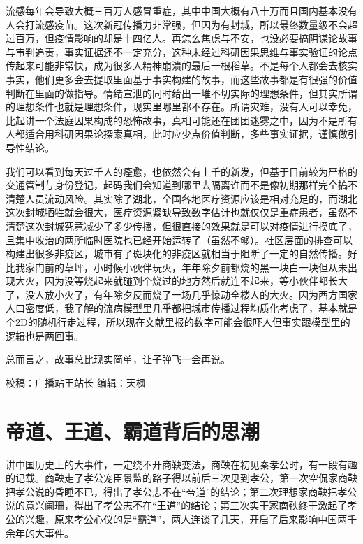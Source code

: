 \documentclass[
]{book}
\begin{document}
流感每年会导致大概三百万人感冒重症，其中中国大概有八十万而且国内基本没有人会打流感疫苗。这次新冠传播力非常强，但因为有封城，所以最终数量级不会超过百万，但疫情影响的却是十四亿人。再怎么焦虑与不安，也没必要搞阴谋论故事与审判追责，事实证据还不一定充分，这种未经过科研因果思维与事实验证的论点传起来可能非常快，成为很多人精神崩溃的最后一根稻草。不是每个人都会去核实事实，他们更多会去提取里面基于事实构建的故事，而这些故事都是有很强的价值判断在里面的做指导。情绪宣泄的同时给出一堆不切实际的理想条件，但其实所谓的理想条件也就是理想条件，现实里哪里都不存在。所谓灾难，没有人可以幸免，比起讲一个法庭因果构成的恐怖故事，真相可能还在团团迷雾之中，因为不是所有人都适合用科研因果论探索真相，此时应少点价值判断，多些事实证据，谨慎做引导性结论。

我们可以看到每天过千人的痊愈，也依然会有上千的新发，但基于目前较为严格的交通管制与身份登记，起码我们会知道到哪里去隔离谁而不是像初期那样完全搞不清楚人员流动风险。其实除了湖北，全国各地医疗资源应该是相对充足的，而湖北这次封城牺牲就会很大，医疗资源紧缺导致数字估计也就仅仅是重症患者，虽然不清楚这次封城究竟减少了多少传播，但很直接的效果就是可以对疫情进行摸底了，且集中收治的两所临时医院也已经开始运转了（虽然不够）。社区层面的排查可以构建出很多非疫区，城市有了斑块化的非疫区就相当于阻断了一定的自然传播。好比我家门前的草坪，小时候小伙伴玩火，年年除夕前都烧的黑一块白一块但从未出现大火，因为没等烧起来就碰到个烧过的地方然后就连不起来，等小伙伴都长大了，没人放小火了，有年除夕反而烧了一场几乎惊动全楼人的大火。因为西方国家人口密度低，我了解的流病模型里几乎都把城市传播过程均质化考虑了，基本就是个2D的随机行走过程，所以现在文献里报的数字可能会很吓人但事实跟模型里的逻辑也是两回事。

总而言之，故事总比现实简单，让子弹飞一会再说。

校稿：广播站王站长
编辑：天枫

\hypertarget{ux5e1dux9053ux738bux9053ux9738ux9053ux80ccux540eux7684ux601dux6f6e}{%
\section{帝道、王道、霸道背后的思潮}\label{ux5e1dux9053ux738bux9053ux9738ux9053ux80ccux540eux7684ux601dux6f6e}}

讲中国历史上的大事件，一定绕不开商鞅变法，商鞅在初见秦孝公时，有一段有趣的记载。商鞅走了孝公宠臣景监的路子得以前后三次见到孝公，第一次空侃家商鞅把孝公说的昏睡不已，得出了孝公志不在``帝道''的结论；第二次理想家商鞅把孝公说的意兴阑珊，得出了孝公志不在``王道''的结论；第三次实干家商鞅终于激起了孝公的兴趣，原来孝公心仪的是``霸道''，两人连谈了几天，开启了后来影响中国两千余年的大事件。
\end{document}
